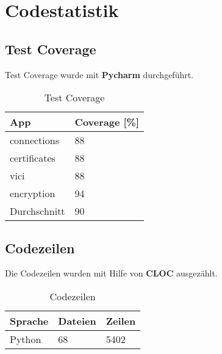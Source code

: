 \section{Codestatistik}
\subsection{Test Coverage}
Test Coverage wurde mit \textbf{Pycharm} durchgeführt. \\

\begin{table}[H]
\centering
    \begin{tabular}{|p{6cm}|p{6cm}|}
    \hline    
    \rowcolor{lightblue}
	App & Coverage [\%] \\ \hline
	connections & 88 \\ \hline    
	certificates & 88 \\ \hline   
	vici & 88 \\ \hline  
	encryption & 94 \\ \hline  
	\rowcolor{lightblue}
	Durchschnitt &   90 \\ \hline
    \end{tabular}
    \caption[Test Coverage]{Test Coverage}
\end{table}

\subsection{Codezeilen}
Die Codezeilen wurden mit Hilfe von \textbf{CLOC} \cite{CLOC} ausgezählt. \\

\begin{table}[H]
\centering
    \begin{tabular}{|p{3cm} |p{3cm} |p{3cm} |}
    \hline    
    \rowcolor{lightblue}
	Sprache & Dateien & Zeilen  \\ \hline   
	Python & 68 & 5402 \\ \hline
    \end{tabular}
    \caption[Codezeilen]{Codezeilen}
\end{table}

